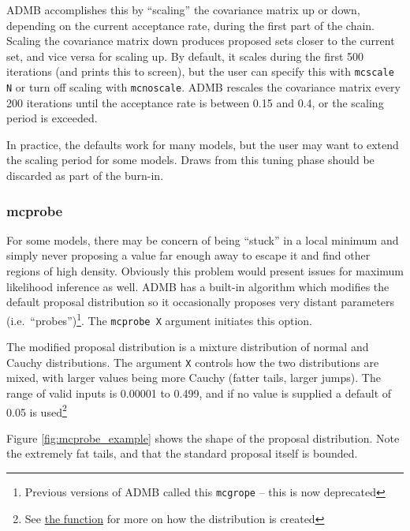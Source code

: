 \documentclass{article}\usepackage[]{graphicx}\usepackage[]{color}
\begin{document}
ADMB accomplishes this by ``scaling'' the covariance matrix
up or down, depending on the current acceptance rate, during
the first part of the chain. Scaling the covariance matrix
down produces proposed sets closer to the current set, and
vice versa for scaling up. By default, it scales during the
first 500 iterations (and prints this to screen), but the
user can specify this with \texttt{mcscale N} or turn off
scaling with \texttt{mcnoscale}. ADMB rescales the
covariance matrix every 200 iterations until the acceptance
rate is between 0.15 and 0.4, or the scaling period is
exceeded.

In practice, the defaults work for many models, but the user
may want to extend the scaling period for some models. Draws
from this tuning phase should be discarded as part of the
burn-in.
\subsubsection{mcprobe}\label{sec:mcprobe}
For some models, there may be concern of being ``stuck'' in
a local minimum and simply never proposing a value far
enough away to escape it and find other regions of high
density. Obviously this problem would present issues for
maximum likelihood inference as well. ADMB has a built-in
algorithm which modifies the default proposal distribution
so it occasionally proposes very distant parameters
(i.e.\ ``probes'')\footnote{Previous versions of ADMB called
  this \texttt{mcgrope} -- this is now deprecated}. The
\texttt{mcprobe X} argument initiates this option.

The modified proposal distribution is a mixture distribution
of normal and Cauchy distributions. The argument \texttt{X}
controls how the two distributions are mixed, with larger
values being more Cauchy (fatter tails, larger jumps). The
range of valid inputs is 0.00001 to 0.499, and if no value
is supplied a default of 0.05 is used\footnote{See
  \href{http://admb-project.org/documentation/api/prmonte\_8cpp\_source.html\#l00014}{the
    function} for more on how the distribution is created}



Figure \ref{fig:mcprobe_example} shows the shape of the
proposal distribution. Note the extremely fat tails, and
that the standard proposal itself is bounded.
\end{document}
